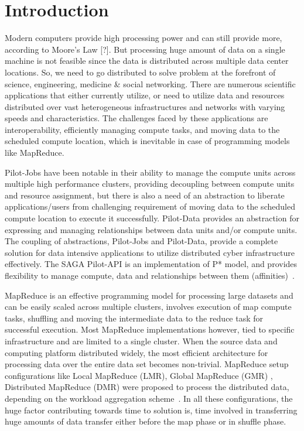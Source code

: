 \documentclass{acm_proc_article-sp}
\begin{document}


\section{Introduction}
Modern computers provide high processing power and can still provide more,
according to Moore's Law [?]. But processing huge amount of data on a single
machine is not feasible since the data is distributed across multiple data
center locations. So, we need to go distributed to solve problem at the
forefront of science, engineering, medicine \& social networking. There are
numerous scientific applications that either currently utilize, or need to
utilize data and resources distributed over vast heterogeneous infrastructures
and networks with varying speeds and characteristics. The challenges faced by
these applications are interoperability, efficiently managing compute tasks,
and moving data to the scheduled compute location, which is inevitable in case
of programming models like MapReduce.

Pilot-Jobs have been notable in their ability to manage the compute units
across multiple high performance clusters, providing decoupling between
compute units and resource assignment, but there is also a need of an
abstraction to liberate applications/users from challenging requirement of
moving data to the scheduled compute location to execute it successfully.
Pilot-Data provides an abstraction for expressing and managing relationships
between data units and/or compute units. The coupling of abstractions,
Pilot-Jobs and Pilot-Data, provide a complete solution for data intensive
applications to utilize distributed cyber infrastructure effectively. The SAGA
Pilot-API is an implementation of P* model, and provides flexibility to manage
compute, data and relationships between them (affinities)~\cite{pstar-2012}.

MapReduce is an effective programming model for processing large datasets and
can be easily scaled across multiple clusters, involves execution of map
compute tasks, shuffling and moving the intermediate data to the reduce task
for successful execution. Most MapReduce implementations however, tied to
specific infrastructure and are limited to a single cluster. When the source
data and computing platform distributed widely, the most efficient
architecture for processing data over the entire data set becomes non-trivial.
MapReduce setup configurations like Local MapReduce (LMR), Global
MapReduce (GMR) , Distributed MapReduce (DMR) were proposed to process the
distributed data, depending on the workload aggregation
scheme~\cite{weissman-mr-11}. In all these configurations, the huge factor
contributing towards time to solution is, time involved in transferring huge
amounts of data transfer either before the map phase or in shuffle phase.
\end{document}
